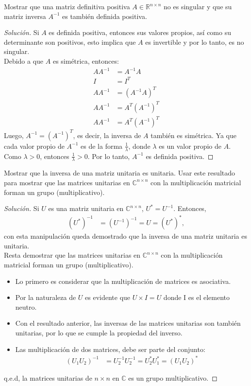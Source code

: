 \documentclass[12pt]{book}
\newcommand{\C}{\mathbb{C}}
\newcommand{\R}{\mathbb{R}}
\newenvironment{solucion}
  {\renewcommand\qedsymbol{$\square$}\begin{proof}[Solución]}
  {\end{proof}}
\begin{document}
\eje Mostrar que una matriz definitiva positiva $A\in\R^{n\times n}$ no es singular y que su matriz inversa $A^{-1}$ es también definida positiva.
\begin{solucion}
Si $A$ es definida positiva, entonces sus valores propios, así como su determinante son positivos, esto implica que $A$ es invertible y por lo tanto, es no singular.\\
Debido a que $A$ es simétrica, entonces:
\begin{align*}
    AA^{-1}&=A^{-1}A\\   
    I&=I^T\\
    AA^{-1}&=\left(A^{-1}A\right)^T\\
    AA^{-1}&=A^T\left(A^{-1}\right)^T\\
    AA^{-1}&=A^T\left(A^{-1}\right)^T
\end{align*}
Luego, $A^{-1}=\left(A^{-1}\right)^T$, es decir, la inversa de $A$ también es simétrica. Ya que cada valor propio de $A^{-1}$ es de la forma $\frac{1}{\lambda}$, donde $\lambda$ es un valor propio de $A$. Como $\lambda>0$, entonces $\frac{1}{\lambda}>0$. Por lo tanto, $A^{-1}$ es definida positiva.
\end{solucion}

\eje Mostrar que la inversa de una matriz unitaria es unitaria. Usar este resultado para mostrar que las matrices unitarias en $\C^{n\times n}$ con la multiplicación matricial forman un grupo (multiplicativo).
\begin{solucion}
Si $U$ es una matriz unitaria en $\C^{n\times n}$, $U^*=U^{-1}$. Entonces,
\begin{align*}
    \left(U^*\right)^{-1}&=\left(U^{-1}\right)^{-1}=U=\left(U^*\right)^*,
\end{align*}
con esta manipulación queda demostrado que la inversa de una matriz unitaria es unitaria.\\

Resta demostrar que las matrices unitarias en $\C^{n\times n}$ con la multiplicación matricial forman un grupo (multiplicativo). 
\begin{itemize}
    \item Lo primero es considerar que la multiplicación de matrices es asociativa.
    \item Por la naturaleza de $U$ es evidente que $U\times I=U$ donde I es el elemento neutro.
    \item Con el resultado anterior, las inversas de las matrices unitarias son también unitarias, por lo que se cumple la propiedad del inverso.
    \item Las multiplicación de dos matrices, debe ser parte del conjunto:
        \begin{align*}
            \left(U_1U_2\right)^{-1}&=U_2^{-1}U_2^{-1}=U_2^*U^*_1=\left(U_1U_2\right)^*
        \end{align*}
        
\end{itemize}
q.e.d, la matrices unitarias de $n\times n$ en $\C$ es un grupo multiplicativo.
\end{solucion}
\end{document}
